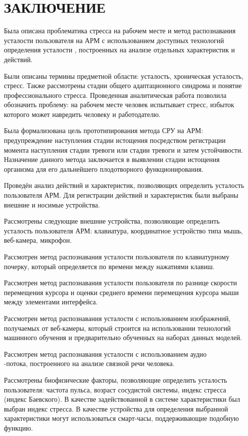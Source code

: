 \section*{ЗАКЛЮЧЕНИЕ}

Была описана проблематика стресса на рабочем месте и метод распознавания усталости пользователя на АРМ с использованием доступных технологий определения усталости , построенных на анализе отдельных характеристик и действий.

Были описаны термины предметной области: усталость, хроническая усталость, стресс. Также рассмотрены стадии общего адаптационного синдрома и понятие профессионального стресса. Проведенная аналитическая работа позволила обозначить проблему: на рабочем месте человек испытывает стресс, избыток которого может навредить человеку и работодателю.

Была формализована цель прототипирования метода СРУ на АРМ: предупреждение наступления стадии истощения посредством регистрации момента наступления стадии тревоги или стадии тревоги и затем устойчивости. Назначение данного метода заключается в выявлении стадии истощения организма для его дальнейшего плодотворного функционирования.

Проведён анализ действий и характеристик, позволяющих определить усталость пользователя АРМ. Для регистрации действий и характеристик были выбраны внешние и носимые устройства.

Рассмотрены следующие внешние устройства, позволяющие определить усталость пользователя АРМ: клавиатура, координатное устройство типа мышь, веб-камера, микрофон.

Рассмотрен метод распознавания усталости пользователя по клавиатурному почерку, который определяется по времени между нажатиями клавиш. 

Рассмотрен метод распознавания усталости пользователя по разнице скорости перемещения курсора и оценки среднего времени перемещения курсора мыши между элементами интерфейса.

Рассмотрен метод распознавания усталости с использованием изображений, получаемых от веб-камеры, который строится на использовании технологий машинного обучения и предварительно обученных на наборах данных моделей.

Рассмотрен метод распознавания усталости с использованием аудио\\-потока, построенного на анализе связной речи человека.

Рассмотрены биофизические факторы, позволяющие определить усталость пользователя: частота пульса, возраст сосудистой системы, индекс стресса (индекс Баевского). В качестве задействованной в системе характеристики был выбран индекс стресса. В качестве устройства для определения выбранной характеристики могут использоваться смарт-часы, поддерживающие подобную функцию.

